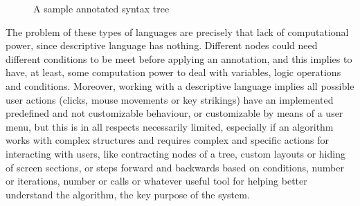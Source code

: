 \documentclass{article}
\begin{document}
\begin{figure}[h!]
\begin{center}
\end{center}
\caption{A sample annotated syntax tree}
\label{fig:annonst}
\end{figure}

The problem of these types of languages are precisely that lack of computational
power, since descriptive language has nothing. Different nodes could need
different conditions to be meet before applying an annotation, and this implies
to have, at least, some computation power to deal with variables, logic
operations and conditions. Moreover, working with a descriptive language implies
all possible user actions (clicks, mouse movements or key strikings) have an
implemented predefined and not customizable behaviour, or customizable by means
of a user menu, but this is in all respects necessarily limited, especially if
an algorithm works with complex structures and requires complex and specific
actions for interacting with users, like contracting nodes of a tree, custom
layouts or hiding of screen sections, or steps forward and backwards based
on conditions, number or iterations, number or calls or whatever useful tool for
helping better understand the algorithm, the key purpose of the system.
\end{document}
